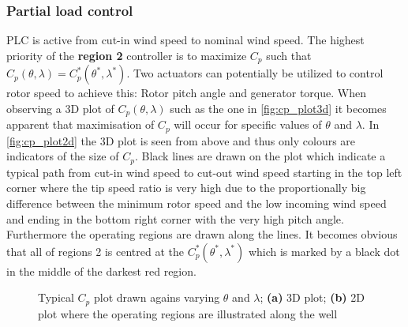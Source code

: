 \subsubsection{Partial load control}
PLC is active from cut-in wind speed to nominal wind speed. The highest priority of the \textbf{region 2} controller is to maximize $ C_p $ such that $ C_p(\theta, \lambda) = C_p^*(\theta^*, \lambda^*) $. Two actuators can potentially be utilized to control rotor speed to achieve this: Rotor pitch angle and generator torque. When observing a 3D plot of $ C_p(\theta, \lambda) $ such as the one in \cref{fig:cp_plot3d} it becomes apparent that maximisation of $ C_p $ will occur for specific values of $ \theta $ and $ \lambda $. In \cref{fig:cp_plot2d} the 3D plot is seen from above and thus only colours are indicators of the size of $ C_p $. Black lines are drawn on the plot which indicate a typical path from cut-in wind speed to cut-out wind speed starting in the top left corner where the tip speed ratio is very high due to the proportionally big difference between the minimum rotor speed and the low incoming wind speed and ending in the bottom right corner with the very high pitch angle. Furthermore the operating regions are drawn along the lines. It becomes obvious that all of regions 2 is centred at the $ C_p^*(\theta^*, \lambda^*) $ which is marked by a black dot in the middle of the darkest red region.
\begin{figure}[ht]
	\centering
	
	\hfil
	
	\caption{Typical $ C_p $ plot drawn agains varying $ \theta $ and $ \lambda $; \textbf{(a)} 3D plot; \textbf{(b)} 2D plot where the operating regions are illustrated along the well}
	\label{fig:cp_plot}
\end{figure}
